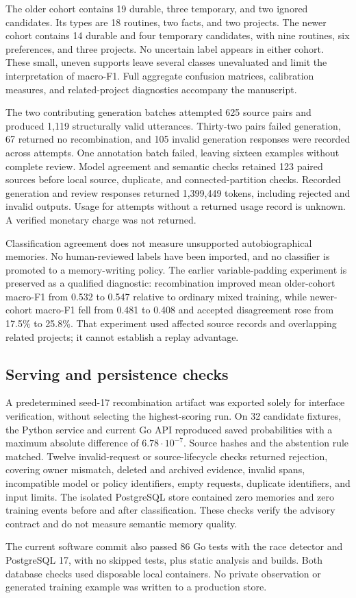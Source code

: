 The older cohort contains 19 durable, three temporary, and two ignored candidates. Its types are 18 routines, two facts, and two projects. The newer cohort contains 14 durable and four temporary candidates, with nine routines, six preferences, and three projects. No uncertain label appears in either cohort. These small, uneven supports leave several classes unevaluated and limit the interpretation of macro-F1. Full aggregate confusion matrices, calibration measures, and related-project diagnostics accompany the manuscript.

The two contributing generation batches attempted 625 source pairs and produced 1,119 structurally valid utterances. Thirty-two pairs failed generation, 67 returned no recombination, and 105 invalid generation responses were recorded across attempts. One annotation batch failed, leaving sixteen examples without complete review. Model agreement and semantic checks retained 123 paired sources before local source, duplicate, and connected-partition checks. Recorded generation and review responses returned 1,399,449 tokens, including rejected and invalid outputs. Usage for attempts without a returned usage record is unknown. A verified monetary charge was not returned.



Classification agreement does not measure unsupported autobiographical memories. No human-reviewed labels have been imported, and no classifier is promoted to a memory-writing policy. The earlier variable-padding experiment is preserved as a qualified diagnostic: recombination improved mean older-cohort macro-F1 from 0.532 to 0.547 relative to ordinary mixed training, while newer-cohort macro-F1 fell from 0.481 to 0.408 and accepted disagreement rose from 17.5\% to 25.8\%. That experiment used affected source records and overlapping related projects; it cannot establish a replay advantage.

\subsection{Serving and persistence checks}
A predetermined seed-17 recombination artifact was exported solely for interface verification, without selecting the highest-scoring run. On 32 candidate fixtures, the Python service and current Go API reproduced saved probabilities with a maximum absolute difference of $6.78\cdot10^{-7}$. Source hashes and the abstention rule matched. Twelve invalid-request or source-lifecycle checks returned rejection, covering owner mismatch, deleted and archived evidence, invalid spans, incompatible model or policy identifiers, empty requests, duplicate identifiers, and input limits. The isolated PostgreSQL store contained zero memories and zero training events before and after classification. These checks verify the advisory contract and do not measure semantic memory quality.

The current software commit also passed 86 Go tests with the race detector and PostgreSQL 17, with no skipped tests, plus static analysis and builds. Both database checks used disposable local containers. No private observation or generated training example was written to a production store.
